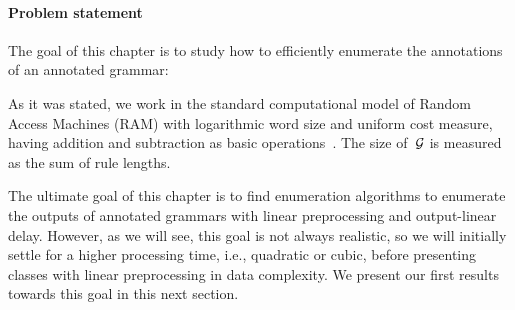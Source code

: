 \paragraph{Problem statement} 
The goal of this chapter is to study how to efficiently enumerate the
annotations of an annotated grammar:
%
%
%
%
%
%
%
%
\smallskip

\begin{center}
\end{center}
\smallskip
As it was stated, we work in the standard computational model of Random Access Machines (RAM)
with logarithmic word size and
uniform cost measure, having addition and subtraction as basic
operations~\cite{AhoHU74}. The size of~$\mathcal{G}$ is measured as the sum of rule lengths.
%
%

The ultimate goal of this chapter is to find enumeration algorithms to enumerate
the outputs of annotated grammars
with linear preprocessing and
output-linear delay.  However, as we will see, this goal
is not always realistic, so we will initially settle for a higher
processing time, i.e., quadratic or cubic, before presenting classes with linear
preprocessing in data complexity.  We present our first results
towards this goal in this next section.

